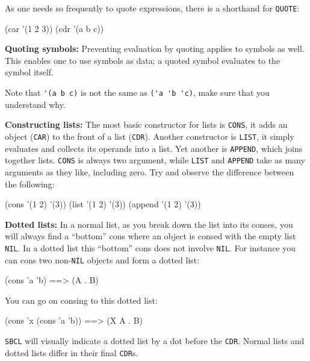 \documentclass[a4paper,11pt]{article}
\begin{document}
\begin{uenum}
\begin{uenumi}
\item As one needs so frequently to quote expressions, there is a shorthand for \Verb+QUOTE+:

\begin{lispcode}
(car '(1 2 3))
(cdr '(a b c))
\end{lispcode}

\end{uenumi}

\item {\bf Quoting symbols:} Preventing evaluation by quoting applies to symbols as well. This enables one to use symbols as data; a quoted symbol evaluates to the symbol itself.

Note that \Verb+'(a b c)+ is not the same as \Verb+('a 'b 'c)+, make sure that you understand why.

\item {\bf Constructing lists:} The most basic constructor for lists is \Verb+CONS+, it adds an object (\Verb+CAR+) to the front of a list (\Verb+CDR+). Another constructor is \Verb+LIST+, it simply evaluates and collects its operands into a list. Yet another is \Verb+APPEND+, which joins together lists. \Verb+CONS+ is always two argument, while \Verb+LIST+ and \Verb+APPEND+ take as many arguments as they like, including zero. Try and observe the difference between the following:

\begin{lispcode}
(cons '(1 2) '(3))
(list '(1 2) '(3))
(append '(1 2) '(3))
\end{lispcode}

\item {\bf Dotted lists:} In a normal list, as you break down the list into its conses, you will always find a ``bottom'' cons where an object is consed with the empty list \Verb+NIL+. In a dotted list this ``bottom'' cons does not involve \Verb+NIL+. For instance you can cons two non-\Verb+NIL+ objects and form a dotted list:

\begin{lispcode}
(cons 'a 'b) ==> (A . B)
\end{lispcode}

You can go on consing to this dotted list:
\begin{lispcode}
(cons 'x (cons 'a 'b)) ==> (X A . B)
\end{lispcode}

\Verb+SBCL+ will visually indicate a dotted list by a dot before the \Verb+CDR+. Normal lists and dotted lists differ in their final \Verb+CDR+s.


\end{uenum}
\end{document}
